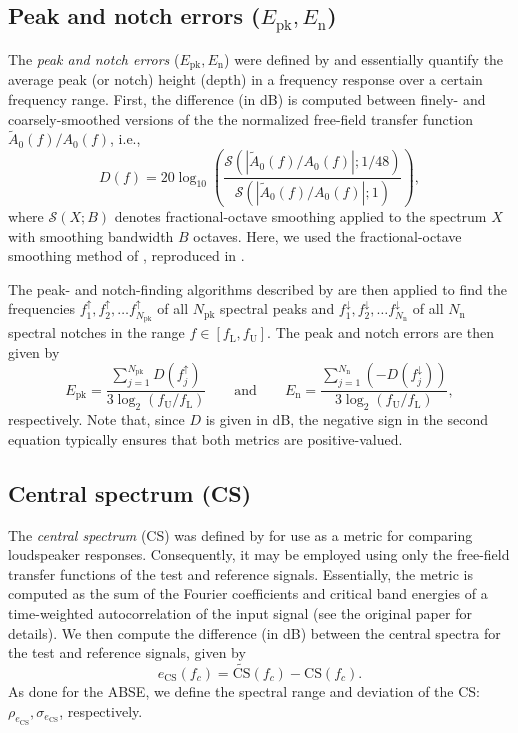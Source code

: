 \subsection{Peak and notch errors (\texorpdfstring{$E_{\text{pk}}, E_\text{n}$}{Epk, En})}\label{sec:04_Auditory_Models:Coloration_Metrics:Epk}
The \textit{peak and notch errors} ($E_{\text{pk}}, E_\text{n}$) were defined by \citet{Boren2015}
and essentially quantify the average peak (or notch) height (depth) in a frequency response over a certain frequency range.
First, the difference (in dB) is computed between finely- and coarsely-smoothed versions of the the normalized free-field transfer function $\tilde{A}_0(f)/A_0(f)$, i.e.,
\begin{equation}
D(f) = 20 \log_{10} \left( \frac{ \mathcal{S}\left( \left| \tilde{A}_0(f)/A_0(f) \right| ; 1/48 \right) }{ \mathcal{S}\left( \left| \tilde{A}_0(f)/A_0(f) \right| ; 1 \right) } \right),
\end{equation}
where $\mathcal{S}(X; B)$ denotes fractional-octave smoothing applied to the spectrum $X$ with smoothing bandwidth $B$ octaves.
Here, we used the fractional-octave smoothing method of \citet{Tylka2017}, reproduced in .

The peak- and notch-finding algorithms described by \citeauthor{Boren2015} are then applied to find the frequencies $f_1^\uparrow, f_2^\uparrow, \dots f_{N_\text{pk}}^\uparrow$ of all $N_\text{pk}$ spectral peaks and $f_1^\downarrow, f_2^\downarrow, \dots f_{N_\text{n}}^\downarrow$  of all $N_\text{n}$ spectral notches in the range $f \in [f_\text{L}, f_\text{U}]$.
The peak and notch errors are then given by \citep[Eq.~(1)]{Boren2015}
\begin{equation}
E_\text{pk} = \frac{\sum_{j = 1}^{N_\text{pk}} D(f_j^\uparrow)}{3 \log_2 (f_\text{U}/f_\text{L})}
\quad\quad\text{and}\quad\quad
E_\text{n} = \frac{\sum_{j = 1}^{N_\text{n}} (-D(f_j^\downarrow))}{3 \log_2 (f_\text{U}/f_\text{L})},
\end{equation}
respectively.
Note that, since $D$ is given in dB, the negative sign in the second equation typically ensures that both metrics are positive-valued.

\subsection{Central spectrum (CS)}
The \textit{central spectrum} (CS) was defined by \citet{Kates1984} for use as a metric for comparing loudspeaker responses.
Consequently, it may be employed using only the free-field transfer functions of the test and reference signals.
Essentially, the metric is computed as the sum of the Fourier coefficients and critical band energies of a time-weighted autocorrelation of the input signal (see the original paper for details).
We then compute the difference (in dB) between the central spectra for the test and reference signals, given by
\begin{equation}
e_\text{CS}(f_c) = \widetilde{\text{CS}}(f_c) - \text{CS}(f_c).
\end{equation}
As done for the ABSE, we define the spectral range and deviation of the CS: $\rho_{e_\text{CS}}, \sigma_{e_\text{CS}}$, respectively.

